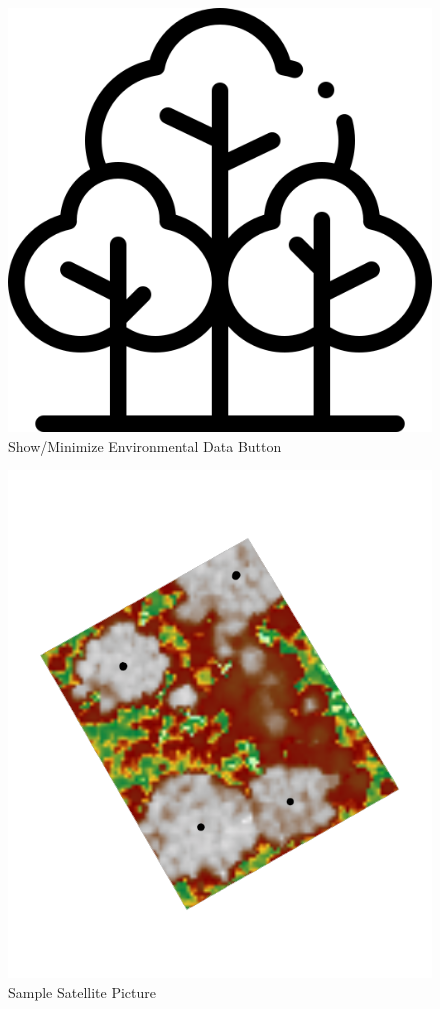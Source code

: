 \documentclass[12pt, titlepage]{article}
\begin{document}
\begin{figure}[H]
    \centering
    \includegraphics[scale = 0.5]{VnV_Pictures/environmental_data.png}
    \caption{Show/Minimize Environmental Data Button}
\end{figure}

\begin{figure}[H]
    \centering
    \includegraphics{VnV_Pictures/Satallite-Pic.png}
    \caption{Sample Satellite Picture}
    \label{fig:SP}
\end{figure}
\end{document}
